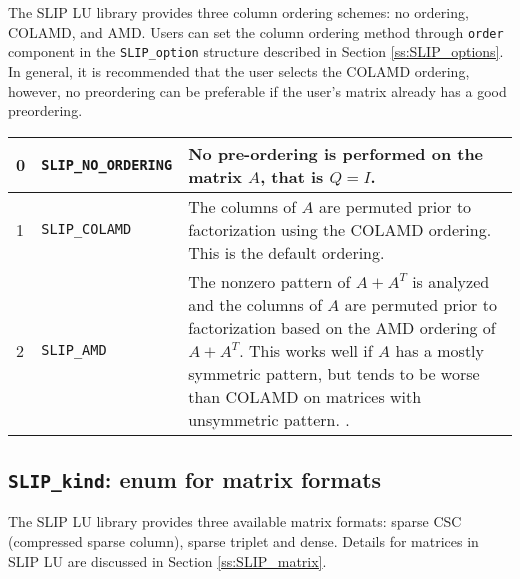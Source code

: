 \documentclass[12pt]{article}
\theoremstyle{definition}
\begin{document}
The SLIP LU library provides three column ordering schemes: no ordering,
COLAMD, and AMD. Users can set the column ordering method through \verb|order|
component in the \verb|SLIP_option| structure described in Section
\ref{ss:SLIP_options}. In general, it is recommended that the user selects the
COLAMD ordering, however, no preordering can be preferable if the user's matrix
already has a good preordering.

{\small
\begin{center}
\begin{tabular}{llp{4in}}
\hline
0 & \verb|SLIP_NO_ORDERING| & No pre-ordering is performed on the matrix $A$,
                              that is $Q = I$. \\
\hline
1 & \verb|SLIP_COLAMD|      & The columns of $A$ are permuted prior to
                              factorization using the COLAMD
                              \cite{davis2004algorithmcolamd} ordering.
                              This is the default ordering. \\
\hline
2 & \verb|SLIP_AMD|         & The nonzero pattern of $A + A^T$ is analyzed and
                              the columns of $A$ are permuted prior to
                              factorization based on the AMD
                              \cite{amestoy2004algorithmamd} ordering of
                              $A+A^T$. This works well if $A$ has a mostly
                              symmetric pattern, but tends to be worse
                              than COLAMD on matrices with unsymmetric pattern.
                              \cite{davis2004column}.\\
\hline
\end{tabular}
\label{tab:SLIP_pivot}
\end{center}
}

\cprotect\subsection{\verb|SLIP_kind|: enum for matrix formats}
\label{ss:SLIP_kind}

The SLIP LU library provides three available matrix formats: sparse CSC
(compressed sparse column), sparse triplet and dense. Details for matrices in
SLIP LU are discussed in Section \ref{ss:SLIP_matrix}.
\end{document}
